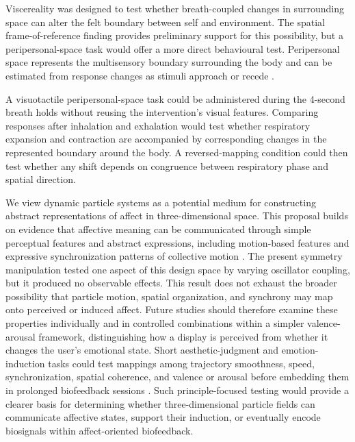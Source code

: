 \documentclass[pdflatex,sn-basic,lineno]{sn-jnl}
\begin{document}
Viscereality was designed to test whether breath-coupled changes in surrounding space can alter the felt boundary between self and environment. The spatial frame-of-reference finding provides preliminary support for this possibility, but a peripersonal-space task would offer a more direct behavioural test. Peripersonal space represents the multisensory boundary surrounding the body and can be estimated from response changes as stimuli approach or recede \citep{Serino2019,Bufacchi2018,Karakoc2025}.

A visuotactile peripersonal-space task could be administered during the 4-second breath holds without reusing the intervention's visual features. Comparing responses after inhalation and exhalation would test whether respiratory expansion and contraction are accompanied by corresponding changes in the represented boundary around the body. A reversed-mapping condition could then test whether any shift depends on congruence between respiratory phase and spatial direction.

We view dynamic particle systems as a potential medium for constructing abstract representations of affect in three-dimensional space. This proposal builds on evidence that affective meaning can be communicated through simple perceptual features and abstract expressions, including motion-based features \citep{Collier1996,deRooij2013,Khatin-Zadeh2019} and expressive synchronization patterns of collective motion \citep{Dietz2017,StOnge2019,Santos2021}. The present symmetry manipulation tested one aspect of this design space by varying oscillator coupling, but it produced no observable effects. This result does not exhaust the broader possibility that particle motion, spatial organization, and synchrony may map onto perceived or induced affect. Future studies should therefore examine these properties individually and in controlled combinations within a simpler valence-arousal framework, distinguishing how a display is perceived from whether it changes the user's emotional state. Short aesthetic-judgment and emotion-induction tasks could test mappings among trajectory smoothness, speed, synchronization, spatial coherence, and valence or arousal before embedding them in prolonged biofeedback sessions \citep{Dietz2017,Santos2021}. Such principle-focused testing would provide a clearer basis for determining whether three-dimensional particle fields can communicate affective states, support their induction, or eventually encode biosignals within affect-oriented biofeedback.
\end{document}
